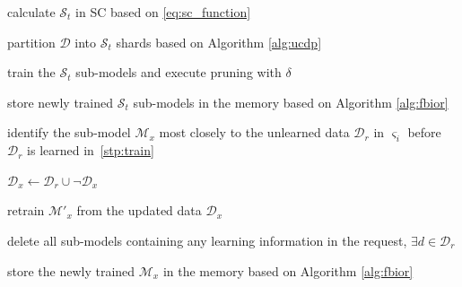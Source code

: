 \documentclass[conference,compsoc]{IEEEtran}
\begin{document}
\begin{algorithm}[t]
\footnotesize
\DontPrintSemicolon

  {
    calculate $\mathcal{S}_t$ in SC based on \eqref{eq:sc_function} 

    partition $\mathcal{D}$ into $\mathcal{S}_t$ shards based on Algorithm \ref{alg:ucdp} 

    train the $\mathcal{S}_t$ sub-models and execute pruning with $\delta$ \label{stp:train}

    store newly trained $\mathcal{S}_t$ sub-models in the memory based on Algorithm \ref{alg:fbior}

     {
      {
        identify the sub-model $\mathcal{M}_x$ most closely to the unlearned data $\mathcal{D}_r$ in $\varsigma_i$ before $\mathcal{D}_r$ is learned in~\cref{stp:train}
        
        $\mathcal{D}_x \leftarrow \mathcal{D}_r \cup \neg \mathcal{D}_x$ 

        retrain $\mathcal{M}'_x$ from the updated data $\mathcal{D}_x$

        delete all sub-models containing any learning information in the request, \ie $\exists d \in \mathcal{D}_r$

        store the newly trained $\mathcal{M}_x$ in the memory based on Algorithm \ref{alg:fbior}
      }
    }
  }

\caption{Resource-constrained Adaptive Exact Unlearning System (\tool)}
\label{alg:cause}
\end{algorithm}
\end{document}
